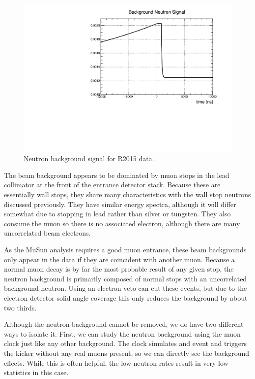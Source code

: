 \begin{figure}[h]
  \includegraphics[width=\textwidth]{neutrons/figures/shape_neuBG.pdf}
  \caption{Neutron background signal for R2015 data.}
  \label{fig:shape_neubg}
\end{figure}

The beam background appears to be dominated by muon stops in the lead collimator at the front of the entrance detector stack.
Because these are essentially wall stops, they share many characteristics with the wall stop neutrons discussed previously. 
They have similar energy spectra, although it will differ somewhat due to stopping in lead rather than silver or tungsten.
They also consume the muon so there is no associated electron, although there are many uncorrelated beam electrons.

As the MuSun analysis requires a good muon entrance, these beam backgrounds only appear in the data if they are coincident with another muon.
Because a normal muon decay is by far the most probable result of any given stop, the neutron background is primarily composed of normal stops with an uncorrelated background neutron.
Using an electron veto can cut these events, but due to the electron detector solid angle coverage this only reduces the background by about two thirds.

Although the neutron background cannot be removed, we do have two different ways to isolate it.
First, we can study the neutron background using the muon clock just like any other background.
The clock simulates and event and triggers the kicker without any real muons present, so we can directly see the background effects.
While this is often helpful, the low neutron rates result in very low statistics in this case.

